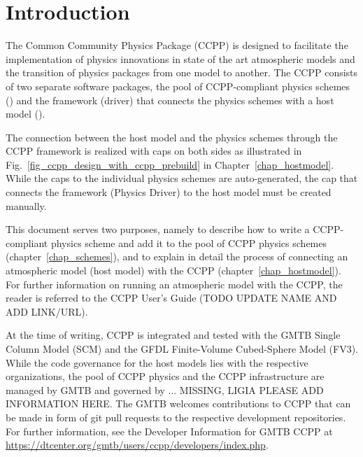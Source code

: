 \chapter{Introduction}\label{chap_introduction}
\setlength{\parskip}{12pt}

The Common Community Physics Package (CCPP) is designed to facilitate the implementation of physics innovations in state of the art atmospheric models and the transition of physics packages from one model to another. The CCPP consists of two separate software packages, the pool of CCPP-compliant physics schemes () and the framework (driver) that connects the physics schemes with a host model ().

The connection between the host model and the physics schemes through the CCPP framework is realized with caps on both sides as illustrated in Fig.~\ref{fig_ccpp_design_with_ccpp_prebuild} in Chapter~\ref{chap_hostmodel}. While the caps to the individual physics schemes are auto-generated, the cap that connects the framework (Physics Driver) to the host model must be created manually.

This document serves two purposes, namely to describe how to write a CCPP-compliant physics scheme and add it to the pool of CCPP physics schemes (chapter~\ref{chap_schemes}), and to explain in detail the process of connecting an atmospheric model (host model) with the CCPP (chapter~\ref{chap_hostmodel}). For further information on running an atmospheric model with the CCPP, the reader is referred to the CCPP User's Guide ({\red TODO UPDATE NAME AND ADD LINK/URL}).

At the time of writing, CCPP is integrated and tested with the GMTB Single Column Model (SCM) and the GFDL Finite-Volume Cubed-Sphere Model (FV3). While the code governance for the host models lies with the respective organizations, the pool of CCPP physics and the CCPP infrastructure are managed by GMTB and governed by ... {\red MISSING, LIGIA PLEASE ADD INFORMATION HERE}. The GMTB welcomes contributions to CCPP that can be made in form of git pull requests to the respective development repositories. For further information, see the Developer Information for GMTB CCPP at \url{https://dtcenter.org/gmtb/users/ccpp/developers/index.php}.
